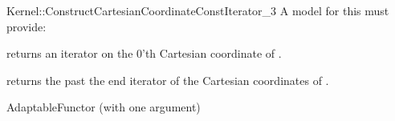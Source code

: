 \begin{ccRefFunctionObjectConcept}{Kernel::ConstructCartesianCoordinateConstIterator_3}
A model for this must provide:



 {returns an iterator on the 0'th Cartesian coordinate of .}

 {returns the past the end iterator of the Cartesian coordinates of .}




\ccRefines
AdaptableFunctor (with one argument)



\end{ccRefFunctionObjectConcept}
